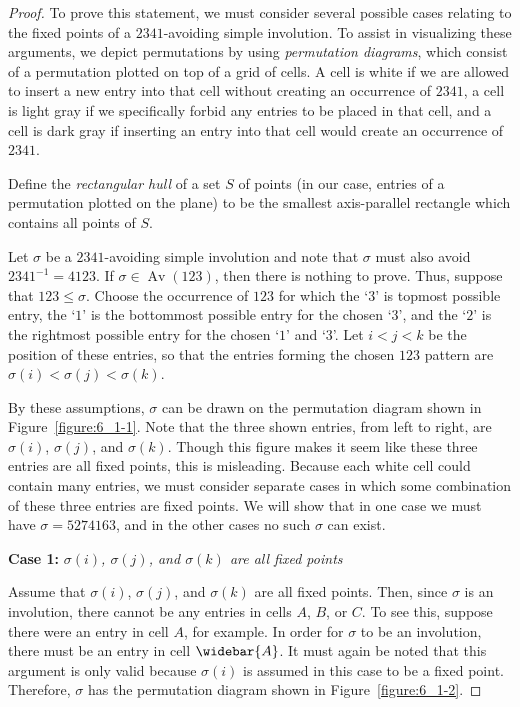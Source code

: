 \documentclass[10pt]{article}
\theoremstyle{plain}
\newcommand{\Av}{\operatorname{Av}}
\begin{document}
\begin{proof}
To prove this statement, we must consider several possible cases relating to the fixed points of a $2341$-avoiding simple involution. To assist in visualizing these arguments, we depict permutations by using \emph{permutation diagrams}, which consist of a permutation plotted on top of a grid of cells. A cell is white if we are allowed to insert a new entry into that cell without creating an occurrence of $2341$, a cell is light gray if we specifically forbid any entries to be placed in that cell, and a cell is dark gray if inserting an entry into that cell would create an occurrence of $2341$. 
	
	Define the \emph{rectangular hull} of a set $S$ of points (in our case, entries of a permutation plotted on the plane) to be the smallest axis-parallel rectangle which contains all points of $S$.
	
	Let $\sigma$ be a $2341$-avoiding simple involution and note that $\sigma$ must also avoid $2341^{-1} = 4123$. If $\sigma \in \Av(123)$, then there is nothing to prove. Thus, suppose that $123 \leq \sigma$. Choose the occurrence of $123$ for which the `$3$' is topmost possible entry, the `$1$' is the bottommost possible entry for the chosen `$3$', and the `$2$' is the rightmost possible entry for the chosen `$1$' and `$3$'. Let $i < j < k$ be the position of these entries, so that the entries forming the chosen $123$ pattern are $\sigma(i) < \sigma(j) < \sigma(k)$.
	
	By these assumptions, $\sigma$ can be drawn on the permutation diagram shown in Figure~\ref{figure:6_1-1}. Note that the three shown entries, from left to right, are $\sigma(i)$, $\sigma(j)$, and $\sigma(k)$. Though this figure makes it seem like these three entries are all fixed points, this is misleading. Because each white cell could contain many entries, we must consider separate cases in which some combination of these three entries are fixed points. We will show that in one case we must have $\sigma = 5274163$, and in the other cases no such $\sigma$ can exist.
	
	\bigskip
	
	\textbf{Case 1:} \emph{$\sigma(i)$, $\sigma(j)$, and $\sigma(k)$ are all fixed points}
	
	Assume that $\sigma(i)$, $\sigma(j)$, and $\sigma(k)$ are all fixed points. Then, since $\sigma$ is an involution, there cannot be any entries in cells $A$, $B$, or $C$. To see this, suppose there were an entry in cell $A$, for example. In order for $\sigma$ to be an involution, there must be an entry in cell $\widebar{A}$. It must again be noted that this argument is only valid because $\sigma(i)$ is assumed in this case to be a fixed point. Therefore, $\sigma$ has the permutation diagram shown in Figure~\ref{figure:6_1-2}. 
	

\end{proof}
\end{document}
